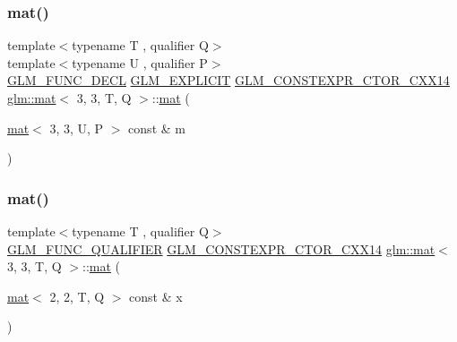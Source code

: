 \mbox{\label{structglm_1_1mat_3_013_00_013_00_01_t_00_01_q_01_4_aaaa9738e2310481af8ab062744c2c426}} 
\subsubsection{\texorpdfstring{mat()}{mat()}\hspace{0.1cm}{\footnotesize\ttfamily [9/21]}}
{\footnotesize\ttfamily template$<$typename T , qualifier Q$>$ \\
template$<$typename U , qualifier P$>$ \\
\mbox{\hyperlink{setup_8hpp_ab2d052de21a70539923e9bcbf6e83a51}{G\+L\+M\+\_\+\+F\+U\+N\+C\+\_\+\+D\+E\+CL}} \mbox{\hyperlink{setup_8hpp_a6c74f5a5e7b134ab69023ff9a30d4d5d}{G\+L\+M\+\_\+\+E\+X\+P\+L\+I\+C\+IT}} \mbox{\hyperlink{setup_8hpp_a0900f9145e68bf6061b6f5e7be3fa751}{G\+L\+M\+\_\+\+C\+O\+N\+S\+T\+E\+X\+P\+R\+\_\+\+C\+T\+O\+R\+\_\+\+C\+X\+X14}} \mbox{\hyperlink{structglm_1_1mat}{glm\+::mat}}$<$ 3, 3, T, Q $>$\+::\mbox{\hyperlink{structglm_1_1mat}{mat}} (\begin{DoxyParamCaption}\item[{\mbox{\hyperlink{structglm_1_1mat}{mat}}$<$ 3, 3, U, P $>$ const \&}]{m }\end{DoxyParamCaption})}

\mbox{\label{structglm_1_1mat_3_013_00_013_00_01_t_00_01_q_01_4_a2833b6b50e5dbd02022a152be73cf83f}} 
\subsubsection{\texorpdfstring{mat()}{mat()}\hspace{0.1cm}{\footnotesize\ttfamily [10/21]}}
{\footnotesize\ttfamily template$<$typename T , qualifier Q$>$ \\
\mbox{\hyperlink{setup_8hpp_a33fdea6f91c5f834105f7415e2a64407}{G\+L\+M\+\_\+\+F\+U\+N\+C\+\_\+\+Q\+U\+A\+L\+I\+F\+I\+ER}} \mbox{\hyperlink{setup_8hpp_a0900f9145e68bf6061b6f5e7be3fa751}{G\+L\+M\+\_\+\+C\+O\+N\+S\+T\+E\+X\+P\+R\+\_\+\+C\+T\+O\+R\+\_\+\+C\+X\+X14}} \mbox{\hyperlink{structglm_1_1mat}{glm\+::mat}}$<$ 3, 3, T, Q $>$\+::\mbox{\hyperlink{structglm_1_1mat}{mat}} (\begin{DoxyParamCaption}\item[{\mbox{\hyperlink{structglm_1_1mat}{mat}}$<$ 2, 2, T, Q $>$ const \&}]{x }\end{DoxyParamCaption})}


